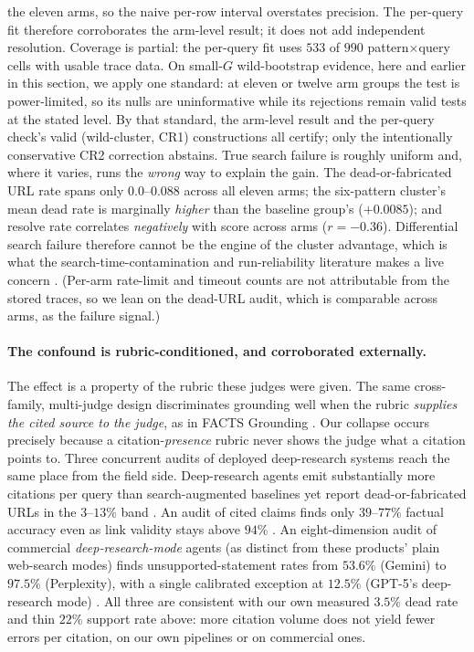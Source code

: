 \documentclass[11pt]{article}
\begin{document}
the eleven arms, so the naive per-row interval overstates precision. The
per-query fit therefore corroborates the arm-level result; it does not add independent
resolution. Coverage is partial: the per-query fit uses $533$ of $990$
pattern$\times$query cells with usable trace data. On small-$G$ wild-bootstrap evidence,
here and earlier in this section, we apply one standard: at eleven or twelve arm groups the test is
power-limited, so its nulls are uninformative while its rejections remain valid tests at
the stated level. By that standard, the arm-level result and the per-query check's valid
(wild-cluster, CR1) constructions all certify; only the intentionally conservative CR2
correction abstains. True search failure is roughly
uniform and, where it varies, runs the \emph{wrong} way to explain the gain. The dead-or-fabricated
URL rate spans only $0.0$--$0.088$ across all eleven arms; the six-pattern cluster's mean
dead rate is
marginally \emph{higher} than the baseline group's ($+0.0085$); and resolve rate
correlates \emph{negatively} with score across arms ($r=-0.36$). Differential search
failure therefore cannot be the engine of the cluster advantage, which is what the
search-time-contamination and run-reliability literature makes a live concern
\citep{searchtimecontam2026}. (Per-arm rate-limit and timeout counts are not attributable from
the stored traces, so we lean on the dead-URL audit, which is comparable across arms, as the
failure signal.)

\paragraph{The confound is rubric-conditioned, and corroborated externally.} The
effect is a property of the rubric these judges were given. The same cross-family,
multi-judge design discriminates grounding well when the rubric \emph{supplies the
cited source to the judge}, as in FACTS Grounding \citep{factsgrounding2025}. Our
collapse occurs precisely because a citation-\emph{presence} rubric never shows the
judge what a citation points to. Three concurrent audits of deployed deep-research systems
reach the same place from the field side. Deep-research agents emit substantially more
citations per query than search-augmented baselines yet report dead-or-fabricated URLs in
the $3$--$13\%$ band \citep{refhalluc2026}. An audit of cited claims finds only $39$--$77\%$
factual accuracy even as link validity stays above $94\%$
\citep{citednotverified2026}. An eight-dimension audit of commercial
\emph{deep-research-mode} agents (as distinct from these products' plain web-search
modes) finds unsupported-statement rates from $53.6\%$ (Gemini) to $97.5\%$ (Perplexity),
with a single calibrated exception at $12.5\%$ (GPT-5's deep-research mode)
\citep{venkit2025deeptrace}. All three are consistent with our own measured $3.5\%$ dead rate and
thin $22\%$ support rate above: more citation volume does not yield fewer errors per
citation, on our own pipelines or on commercial ones.
\end{document}
